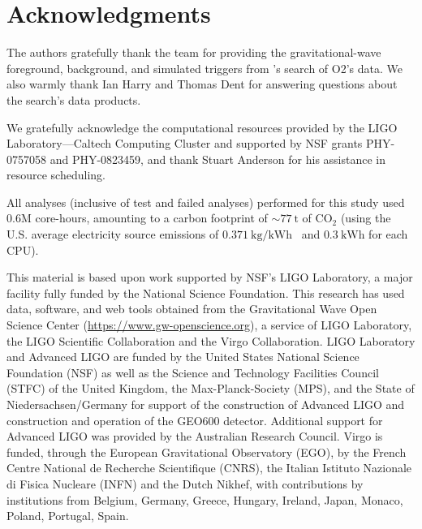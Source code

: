 \documentclass[useAMS,fleqn, usenatbib, final]{mnras}
\begin{document}
\section*{Acknowledgments}{
The authors gratefully thank the \pycbc team for providing the gravitational-wave foreground, background, and simulated triggers from \pycbc's search of O2's data. We also warmly thank Ian Harry and Thomas Dent for answering questions about the \pycbc search's data products.  

We gratefully acknowledge the computational resources provided by the LIGO Laboratory—Caltech Computing Cluster and supported by NSF grants PHY-0757058 and PHY-0823459, and thank Stuart Anderson for his assistance in resource scheduling.

All analyses (inclusive of test and failed analyses) performed for this study used ${0.6\mathrm{M}}$ core-hours, amounting to a carbon footprint of ${\sim77\ \mathrm{t}}$ of ${\text{CO}_2}$ (using the U.S. average electricity source emissions of ${0.371\ \text{kg/kWh}}$~\citep{greenhouse} and ${0.3\ \text{kWh}}$ for each CPU).

This material is based upon work supported by NSF’s LIGO Laboratory, a major facility fully funded by the National Science Foundation. This research has used data, software, and web tools obtained from the Gravitational Wave Open Science Center (\href{https://www.gw-openscience.org}{https://www.gw-openscience.org}), a service of LIGO Laboratory, the LIGO Scientific Collaboration and the Virgo Collaboration. LIGO Laboratory and Advanced LIGO are funded by the United States National Science Foundation (NSF) as well as the Science and Technology Facilities Council (STFC) of the United Kingdom, the Max-Planck-Society (MPS), and the State of Niedersachsen/Germany for support of the construction of Advanced LIGO and construction and operation of the GEO600 detector. Additional support for Advanced LIGO was provided by the Australian Research Council. Virgo is funded, through the European Gravitational Observatory (EGO), by the French Centre National de Recherche Scientifique (CNRS), the Italian Istituto Nazionale di Fisica Nucleare (INFN) and the Dutch Nikhef, with contributions by institutions from Belgium, Germany, Greece, Hungary, Ireland, Japan, Monaco, Poland, Portugal, Spain.


}
\end{document}
